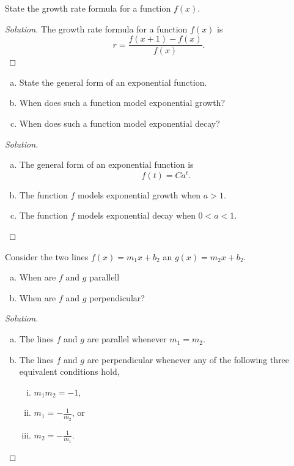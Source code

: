 \documentclass[12pt]{amsart}
\begin{document}
\begin{thm}[5 Points]\label{ex3}
  State the growth rate formula for a function $f(x)$.
  
  \begin{proof}[Solution]
    The growth rate formula for a function $f(x)$ is 
    $$r = \frac{f(x + 1) - f(x)}{f(x)}.$$
  \end{proof}
\end{thm}

\begin{thm}[3 Points]\label{ex4}
  \begin{enumerate}[(a)]
  \item
    State the general form of an exponential function.
    \item
      When does such a function model exponential growth?
    \item
      When does such a function model exponential decay?
  \end{enumerate}
  
  \begin{proof}[Solution]
    \begin{enumerate}[(a)]
    \item
      The general form of an exponential function is $$f(t) = Ca^t.$$
    \item
      The function $f$ models exponential growth when $a > 1$.
    \item
      The function $f$ models exponential decay when $0 < a < 1$.
    \end{enumerate}
  \end{proof}
\end{thm}

\begin{thm}[2 Points]
  Consider the two lines $f(x) = m_1x + b_2$ an $g(x) = m_2x + b_2$.
  \begin{enumerate}[(a)]
  \item
    When are $f$ and $g$ parallell
  \item
    When are $f$ and $g$ perpendicular?
  \end{enumerate}

  \begin{proof}[Solution]
    \begin{enumerate}[(a)]
    \item
      The lines $f$ and $g$ are parallel whenever $m_1 = m_2$.
    \item
      The lines $f$ and $g$ are perpendicular whenever any of the following three equivalent conditions hold,
      \begin{enumerate}[(i)]
        \item
          $m_1m_2 = -1$,
        \item
          $m_1 = -\frac{1}{m_2}$, or
        \item
          $m_2 = -\frac{1}{m_1}$.
      \end{enumerate}
    \end{enumerate}
  \end{proof}
\end{thm}
\end{document}
